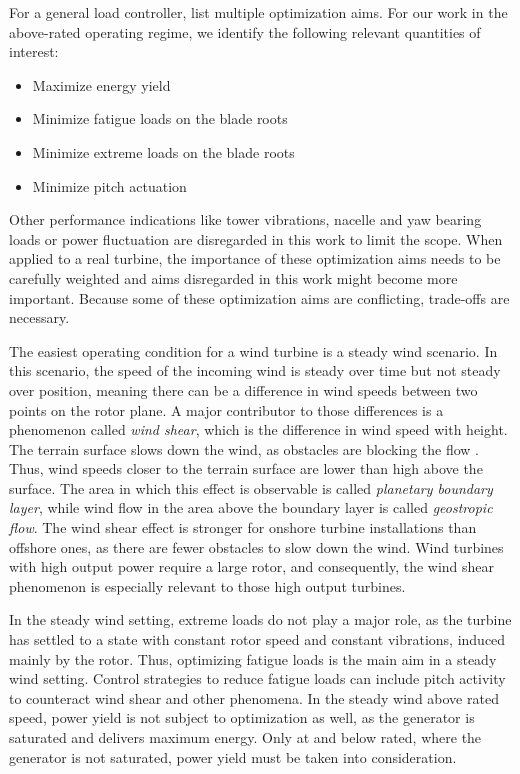 For a general load controller, \citet[Chapter 8.2.6]{burtonWindEnergyHandbook2011} list multiple optimization aims. For our work in the above-rated operating regime, we identify the following relevant quantities of interest:

\begin{itemize}
  \item Maximize energy yield
  \item Minimize fatigue loads on the blade roots
  \item Minimize extreme loads on the blade roots
  \item Minimize pitch actuation
\end{itemize}

Other performance indications like tower vibrations, nacelle and yaw bearing loads or power fluctuation are disregarded in this work to limit the scope. When applied to a real turbine, the importance of these optimization aims needs to be carefully weighted and aims disregarded in this work might become more important. Because some of these optimization aims are conflicting, trade-offs are necessary.

The easiest operating condition for a wind turbine is a steady wind scenario. In this scenario, the speed of the incoming wind is steady over time but not steady over position, meaning there can be a difference in wind speeds between two points on the rotor plane. A major contributor to those differences is a phenomenon called \textit{wind shear}, which is the difference in wind speed with height. The terrain surface slows down the wind, as obstacles are blocking the flow \cite[Table 2.1]{burtonWindEnergyHandbook2011}. Thus, wind speeds closer to the terrain surface are lower than high above the surface. The area in which this effect is observable is called \textit{planetary boundary layer}, while wind flow in the area above the boundary layer is called \textit{geostropic flow}. The wind shear effect is stronger for onshore turbine installations than offshore ones, as there are fewer obstacles to slow down the wind. Wind turbines with high output power require a large rotor, and consequently, the wind shear phenomenon is especially relevant to those high output turbines. \cite[Chapter 2.6.2]{burtonWindEnergyHandbook2011}

In the steady wind setting, extreme loads do not play a major role, as the turbine has settled to a state with constant rotor speed and constant vibrations, induced mainly by the rotor. Thus, optimizing fatigue loads is the main aim in a steady wind setting. Control strategies to reduce fatigue loads can include pitch activity to counteract wind shear and other phenomena. In the steady wind above rated speed, power yield is not subject to optimization as well, as the generator is saturated and delivers maximum energy. Only at and below rated, where the generator is not saturated, power yield must be taken into consideration.

